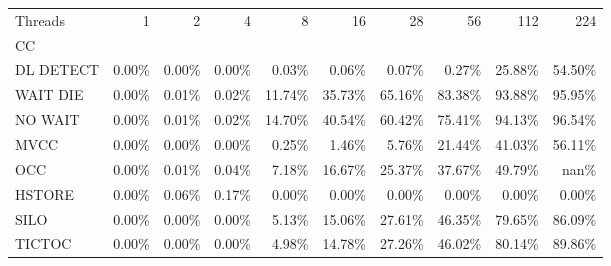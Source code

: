 \begin{tabular}{lrrrrrrrrr}
\toprule
Threads &   1   &   2   &   4   &    8   &    16  &    28  &    56  &    112 &    224 \\
CC        &       &       &       &        &        &        &        &        &        \\
\midrule
DL DETECT & 0.00\% & 0.00\% & 0.00\% &  0.03\% &  0.06\% &  0.07\% &  0.27\% & 25.88\% & 54.50\% \\
WAIT DIE  & 0.00\% & 0.01\% & 0.02\% & 11.74\% & 35.73\% & 65.16\% & 83.38\% & 93.88\% & 95.95\% \\
NO WAIT   & 0.00\% & 0.01\% & 0.02\% & 14.70\% & 40.54\% & 60.42\% & 75.41\% & 94.13\% & 96.54\% \\
MVCC      & 0.00\% & 0.00\% & 0.00\% &  0.25\% &  1.46\% &  5.76\% & 21.44\% & 41.03\% & 56.11\% \\
OCC       & 0.00\% & 0.01\% & 0.04\% &  7.18\% & 16.67\% & 25.37\% & 37.67\% & 49.79\% &   nan\% \\
HSTORE    & 0.00\% & 0.06\% & 0.17\% &  0.00\% &  0.00\% &  0.00\% &  0.00\% &  0.00\% &  0.00\% \\
SILO      & 0.00\% & 0.00\% & 0.00\% &  5.13\% & 15.06\% & 27.61\% & 46.35\% & 79.65\% & 86.09\% \\
TICTOC    & 0.00\% & 0.00\% & 0.00\% &  4.98\% & 14.78\% & 27.26\% & 46.02\% & 80.14\% & 89.86\% \\
\bottomrule
\end{tabular}
